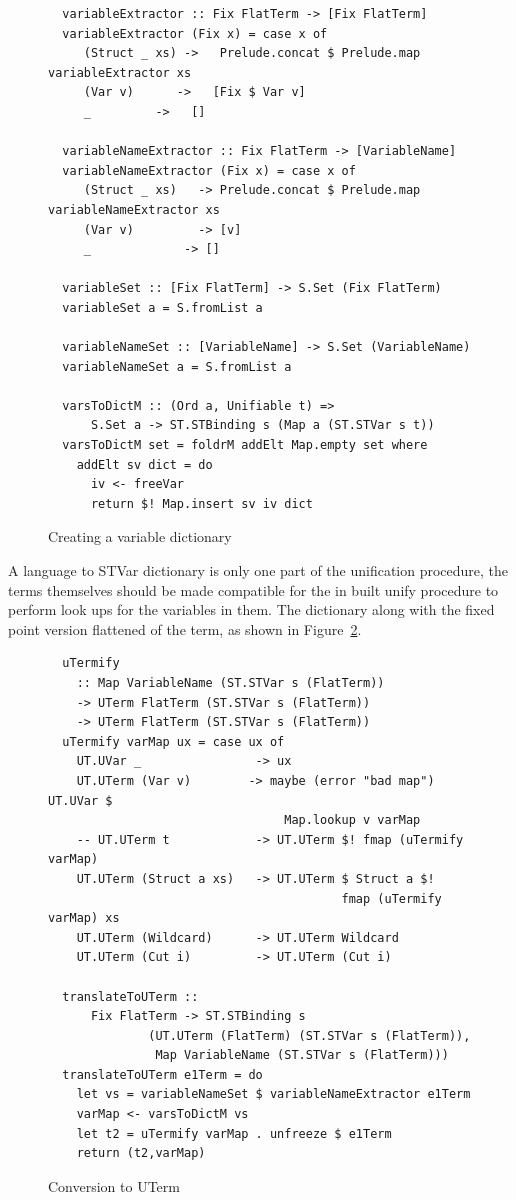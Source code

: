 \documentclass[thesis-solanki.tex]{subfiles}
\begin{document}
\begin{figure}
  \begin{verbatim}
  variableExtractor :: Fix FlatTerm -> [Fix FlatTerm]
  variableExtractor (Fix x) = case x of
     (Struct _ xs) ->   Prelude.concat $ Prelude.map variableExtractor xs
     (Var v)      ->   [Fix $ Var v]
     _         ->   []

  variableNameExtractor :: Fix FlatTerm -> [VariableName]
  variableNameExtractor (Fix x) = case x of
     (Struct _ xs)   -> Prelude.concat $ Prelude.map variableNameExtractor xs
     (Var v)         -> [v]
     _             -> []

  variableSet :: [Fix FlatTerm] -> S.Set (Fix FlatTerm)
  variableSet a = S.fromList a

  variableNameSet :: [VariableName] -> S.Set (VariableName)
  variableNameSet a = S.fromList a

  varsToDictM :: (Ord a, Unifiable t) =>
      S.Set a -> ST.STBinding s (Map a (ST.STVar s t))
  varsToDictM set = foldrM addElt Map.empty set where
    addElt sv dict = do
      iv <- freeVar
      return $! Map.insert sv iv dict
  \end{verbatim}
  \vspace*{-1.0\baselineskip}
  \caption{Creating a variable dictionary}
  \label{tab:varsToDictM}
\end{figure}
A language to STVar dictionary is only one part of the unification procedure, the terms themselves should be made
compatible for the in built unify procedure to perform look ups for the variables in them.
The dictionary along with the fixed point version flattened of the term, as shown in Figure~\ref{tab:to-UTerm}.
%
\begin{figure}
  \begin{verbatim}
  uTermify
    :: Map VariableName (ST.STVar s (FlatTerm))
    -> UTerm FlatTerm (ST.STVar s (FlatTerm))
    -> UTerm FlatTerm (ST.STVar s (FlatTerm))
  uTermify varMap ux = case ux of
    UT.UVar _                -> ux
    UT.UTerm (Var v)        -> maybe (error "bad map") UT.UVar $
                                 Map.lookup v varMap
    -- UT.UTerm t            -> UT.UTerm $! fmap (uTermify varMap)
    UT.UTerm (Struct a xs)   -> UT.UTerm $ Struct a $!
                                         fmap (uTermify varMap) xs
    UT.UTerm (Wildcard)      -> UT.UTerm Wildcard
    UT.UTerm (Cut i)         -> UT.UTerm (Cut i)

  translateToUTerm ::
      Fix FlatTerm -> ST.STBinding s
              (UT.UTerm (FlatTerm) (ST.STVar s (FlatTerm)),
               Map VariableName (ST.STVar s (FlatTerm)))
  translateToUTerm e1Term = do
    let vs = variableNameSet $ variableNameExtractor e1Term
    varMap <- varsToDictM vs
    let t2 = uTermify varMap . unfreeze $ e1Term
    return (t2,varMap)
  \end{verbatim}
  \caption{Conversion to UTerm}
  \label{tab:to-UTerm}
\end{figure}
\end{document}
